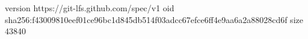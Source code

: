 version https://git-lfs.github.com/spec/v1
oid sha256:f43009810eef01ce96bc1d845db514f03adcc67efce6ff4e9aa6a2a88028cd6f
size 43840
